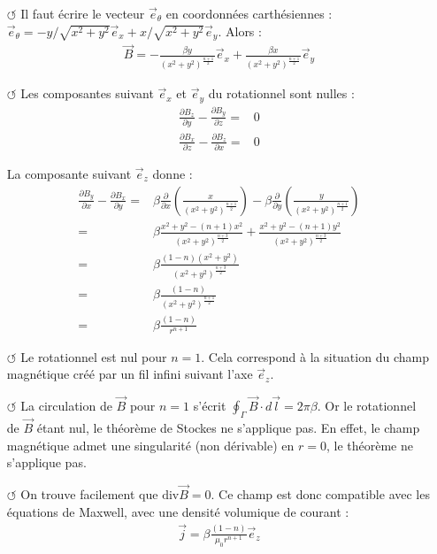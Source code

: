 \documentclass{report}
\begin{document}
\begin{itemize}

	\item[$\circlearrowleft$] Il faut écrire le vecteur $\vec{e}_\theta$ en coordonnées carthésiennes : $\vec{e}_\theta=-y/\sqrt{x^2+y^2}\vec{e}_x+x/\sqrt{x^2+y^2}\vec{e}_y$. Alors :
	\begin{align*}
		\vec{B} = -\frac{\beta y}{\left(x^2+y^2\right)^{\frac{n+1}{2}}}\vec{e}_x+\frac{\beta x}{\left(x^2+y^2\right)^{\frac{n+1}{2}}}\vec{e}_y
	\end{align*}

	\item[$\circlearrowleft$] Les composantes suivant $\vec{e}_x$ et $\vec{e}_y$ du rotationnel sont nulles :
	\begin{align*}
		\frac{\partial B_z}{\partial y}-\frac{\partial B_y}{\partial z}=&0 \\
		\frac{\partial B_x}{\partial z}-\frac{\partial B_z}{\partial x}=&0
	\end{align*}
	
	La composante suivant $\vec{e}_z$ donne :
	\begin{align*}
		\frac{\partial B_y}{\partial x}-\frac{\partial B_x}{\partial y}=&\beta\frac{\partial }{\partial x}\left( \frac{x}{{\left(x^2+y^2 \right)^\frac{n+1}{2}}}\right) -\beta\frac{\partial }{\partial y}\left( \frac{y}{{\left(x^2+y^2 \right)^\frac{n+1}{2}}}\right) \\
		=& \beta\frac{x^2+y^2-(n+1)x^2}{{\left(x^2+y^2 \right)^\frac{n+3}{2}}}+\frac{x^2+y^2-(n+1)y^2}{{\left(x^2+y^2\right)^\frac{n+3}{2}}} \\
		=& \beta\frac{(1-n)(x^2+y^2)}{{\left(x^2+y^2 \right)^\frac{n+3}{2}}} \\
		=& \beta\frac{(1-n)}{{\left(x^2+y^2 \right)^\frac{n+1}{2}}} \\
		=& \beta\frac{(1-n)}{{r^{n+1}}}
	\end{align*}
	
	\item[$\circlearrowleft$] Le rotationnel est nul pour $n=1$. Cela correspond à la situation du champ magnétique créé par un fil infini suivant l'axe $\vec{e}_z$.
	
	\item[$\circlearrowleft$] La circulation de $\vec{B}$ pour $n=1$ s'écrit $\oint_\Gamma\vec{B}\cdot d\vec{l}=2\pi \beta$. Or le rotationnel de $\vec{B}$ étant nul, le théorème de Stockes ne s'applique pas. En effet, le champ magnétique admet une singularité (non dérivable) en $r=0$, le théorème ne s'applique pas.
	
	\item[$\circlearrowleft$] On trouve facilement que $\mathrm{div}\vec{B}=0$. Ce champ est donc compatible avec les équations de Maxwell, avec une densité volumique de courant :
	\begin{align*}
		\vec{j}=\beta\frac{(1-n)}{{\mu_0r^{n+1}}}\vec{e}_z
	\end{align*}

\end{itemize}
\end{document}
